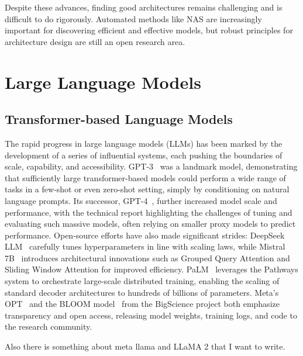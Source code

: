 Despite these advances, finding good architectures remains challenging and is difficult to do rigorously. Automated methods like NAS are increasingly important for discovering efficient and effective models, but robust principles for architecture design are still an open research area.

\section{Large Language Models}

\subsection{Transformer-based Language Models}

The rapid progress in large language models (LLMs) has been marked by the development of a series of influential systems, each pushing the boundaries of scale, capability, and accessibility. GPT-3~\citep{brown2020gpt3} was a landmark model, demonstrating that sufficiently large transformer-based models could perform a wide range of tasks in a few-shot or even zero-shot setting, simply by conditioning on natural language prompts. Its successor, GPT-4~\citep{openai2023gpt4}, further increased model scale and performance, with the technical report highlighting the challenges of tuning and evaluating such massive models, often relying on smaller proxy models to predict performance. Open-source efforts have also made significant strides: DeepSeek LLM~\citep{deepseek2024llm} carefully tunes hyperparameters in line with scaling laws, while Mistral 7B~\citep{jiang2023mistral} introduces architectural innovations such as Grouped Query Attention and Sliding Window Attention for improved efficiency. PaLM~\citep{chowdhery2023palm} leverages the Pathways system to orchestrate large-scale distributed training, enabling the scaling of standard decoder architectures to hundreds of billions of parameters. Meta's OPT~\citep{zhang2022opt} and the BLOOM model~\citep{le2023bloom} from the BigScience project both emphasize transparency and open access, releasing model weights, training logs, and code to the research community.

Also there is something about meta llama \citep{touvron2023llama} and LLaMA 2 \citep{touvron2023llama2} that I want to write.



